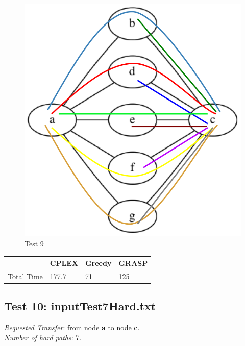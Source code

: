 \documentclass[11pt,a4paper]{article}
\begin{document}
\begin{figure}[H]
  \centering
    \includegraphics[scale=0.7]{inputTest5Hard.png}
  \caption{Test 9}
  \label{fig:test9}
\end{figure}

\begin{tabular}{| l | l | l | l |}
\hline
 & CPLEX & Greedy & GRASP \\ \hline
Total Time & 177.7 & 71 & 125 \\ \hline
\end{tabular}

\subsection{Test 10: inputTest7Hard.txt}

\textit{Requested Transfer}: from node \textbf{a} to node \textbf{c}.\\
\textit{Number of hard paths}: 7.\\
\end{document}
